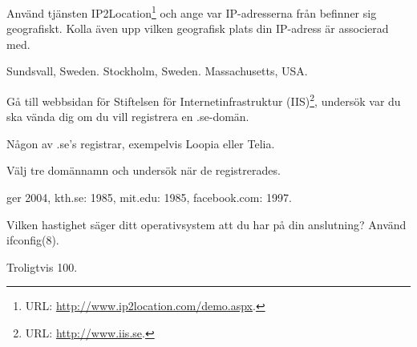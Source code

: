 \documentclass[a4paper]{miunasgn}
\begin{document}
\begin{questions}
\begin{solution}
\end{solution}

\question
Använd tjänsten IP2Location\footnote{%
	URL: \url{http://www.ip2location.com/demo.aspx}.
} och ange var IP-adresserna från  befinner sig
geografiskt.
Kolla även upp vilken geografisk plats din IP-adress är associerad med.
\begin{solution}
	Sundsvall, Sweden. Stockholm, Sweden. Massachusetts, USA.
\end{solution}

\question
Gå till webbsidan för Stiftelsen för Internetinfrastruktur (IIS)\footnote{%
	URL: \url{http://www.iis.se}.
}, undersök var du ska vända dig om du vill registrera en .se-domän.
\begin{solution}
	Någon av .se's registrar, exempelvis Loopia eller Telia.
\end{solution}

\question
Välj tre domännamn och undersök när de registrerades.
\begin{solution}
	 ger 2004,
	kth.se: 1985,
	mit.edu: 1985,
	facebook.com: 1997.
\end{solution}



\question
Vilken hastighet säger ditt operativsystem att du har på din anslutning?
Använd ifconfig(8).
\begin{solution}
	Troligtvis \unit{100}{\mega\bit\per\second}.
\end{solution}


\end{questions}
\end{document}
